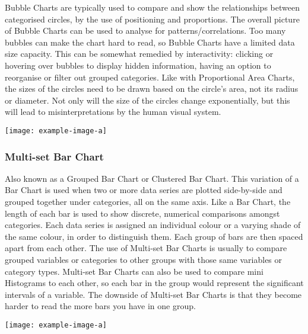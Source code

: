 Bubble Charts are typically used to compare and show the relationships between 
categorised circles, by the use of positioning and proportions. The overall 
picture of Bubble Charts can be used to analyse for patterns/correlations. Too 
many bubbles can make the chart hard to read, so Bubble Charts have a limited 
data size capacity. This can be somewhat remedied by interactivity: clicking or 
hovering over bubbles to display hidden information, having an option to 
reorganise or filter out grouped categories. Like with Proportional Area Charts, 
the sizes of the circles need to be drawn based on the circle’s area, not its 
radius or diameter. Not only will the size of the circles change exponentially, 
but this will lead to misinterpretations by the human visual system.

\texttt{[image: example-image-a]} 

\subsubsection{Multi-set Bar Chart}
Also known as a Grouped Bar Chart or Clustered Bar Chart. This variation of a Bar 
Chart is used when two or more data series are plotted 
side-by-side and grouped together under categories, all on the same axis. Like a 
Bar Chart, the length of each bar is used to show discrete, numerical comparisons 
amongst categories. Each data series is assigned an individual colour or a 
varying shade of the same colour, in order to distinguish them. Each group of 
bars are then spaced apart from each other. The use of Multi-set Bar Charts is 
usually to compare grouped variables or categories to other groups with those 
same variables or category types. Multi-set Bar Charts can also be used to compare 
mini Histograms to each other, so each bar in the group would represent the 
significant intervals of a variable. The downside of Multi-set Bar Charts is that 
they become harder to read the more bars you have in one group.

\texttt{[image: example-image-a]} 